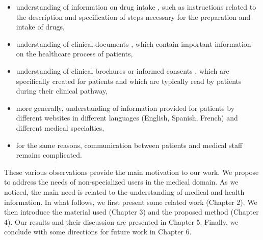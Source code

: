 \begin{itemize}
    \item  understanding of information on drug intake \citep{VanderStichele-WILEY1999,Patel-IJMI2002}, such as instructions related to the description and specification of steps necessary for the preparation and intake of drugs,
    
    \item  understanding of clinical documents \citep{Zeng-MEDINFO2007}, which contain important information on the healthcare process of patients,
    
    \item  understanding of clinical brochures or informed consents \citep{Williams-JAMA1995}, which are specifically created for patients and which are typically read by patients during their clinical pathway,
    
    \item  more generally, understanding of information provided for patients by different websites \citep{Oregon-2008,Brigo-EB2015} in different languages (English, Spanish, French) and different medical specialties,
    
    \item  for the same reasons, communication between patients and medical staff \citep{Jucks-HC2007,Tran-EC2009} remains complicated.
\end{itemize}
These various observations provide the main motivation to our work. We propose to address the needs of non-specialized users in the medical domain. As we noticed, the main need is related to the understanding of medical and health information. In what follows, we first present some related work (Chapter 2). We then introduce the material used (Chapter 3) and the proposed method (Chapter 4). Our results and their discussion are presented in Chapter 5. Finally, we conclude with some directions for future work in Chapter 6.
